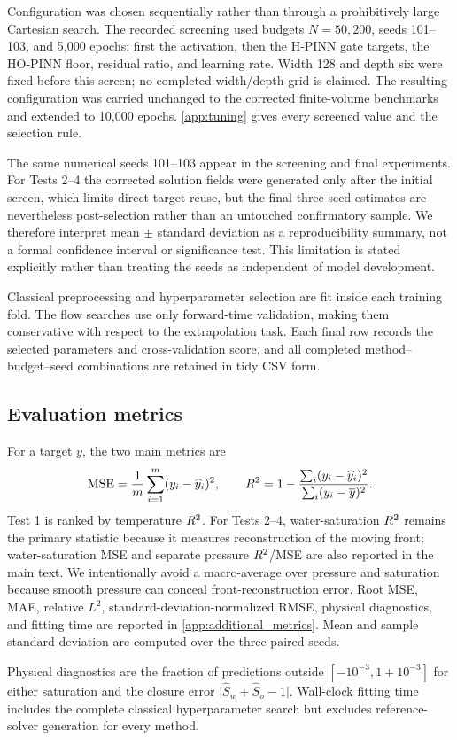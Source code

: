 Configuration was chosen sequentially rather than through a prohibitively large Cartesian search. The recorded screening used budgets \(N=50,200\), seeds 101--103, and 5,000 epochs: first the activation, then the H-PINN gate targets, the HO-PINN floor, residual ratio, and learning rate. Width 128 and depth six were fixed before this screen; no completed width/depth grid is claimed. The resulting configuration was carried unchanged to the corrected finite-volume benchmarks and extended to 10,000 epochs. \ref{app:tuning} gives every screened value and the selection rule.

The same numerical seeds 101--103 appear in the screening and final experiments. For Tests 2--4 the corrected solution fields were generated only after the initial screen, which limits direct target reuse, but the final three-seed estimates are nevertheless post-selection rather than an untouched confirmatory sample. We therefore interpret mean \(\pm\) standard deviation as a reproducibility summary, not a formal confidence interval or significance test. This limitation is stated explicitly rather than treating the seeds as independent of model development.

Classical preprocessing and hyperparameter selection are fit inside each training fold. The flow searches use only forward-time validation, making them conservative with respect to the extrapolation task. Each final row records the selected parameters and cross-validation score, and all completed method--budget--seed combinations are retained in tidy CSV form.

\subsection{Evaluation metrics}

For a target \(y\), the two main metrics are
\begin{equation}
    \mathrm{MSE}
    =\frac{1}{m}\sum_{i=1}^{m}(y_i-\widehat y_i)^2,
    \qquad
    R^2
    =1-\frac{\sum_i(y_i-\widehat y_i)^2}
    {\sum_i(y_i-\overline y)^2}.
\end{equation}
Test 1 is ranked by temperature \(R^2\). For Tests 2--4, water-saturation \(R^2\) remains the primary statistic because it measures reconstruction of the moving front; water-saturation MSE and separate pressure \(R^2\)/MSE are also reported in the main text. We intentionally avoid a macro-average over pressure and saturation because smooth pressure can conceal front-reconstruction error. Root MSE, MAE, relative \(L^2\), standard-deviation-normalized RMSE, physical diagnostics, and fitting time are reported in \ref{app:additional_metrics}. Mean and sample standard deviation are computed over the three paired seeds.

Physical diagnostics are the fraction of predictions outside \([-10^{-3},1+10^{-3}]\) for either saturation and the closure error \(\lvert \widehat S_w+\widehat S_o-1\rvert\). Wall-clock fitting time includes the complete classical hyperparameter search but excludes reference-solver generation for every method.
